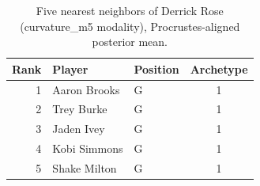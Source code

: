 \begin{table}[htbp]
  \centering\small
  \begin{tabular}{rllc}
    \toprule
    Rank & Player & Position & Archetype \\
    \midrule
    1 & Aaron Brooks & G & 1 \\
    2 & Trey Burke & G & 1 \\
    3 & Jaden Ivey & G & 1 \\
    4 & Kobi Simmons & G & 1 \\
    5 & Shake Milton & G & 1 \\
    \bottomrule
  \end{tabular}
  \caption{Five nearest neighbors of Derrick Rose (curvature_m5 modality), Procrustes-aligned posterior mean.}
  \label{tab:Derrick_Rose_neighbors_curvature_m5}
\end{table}


